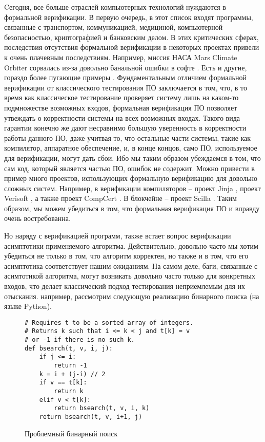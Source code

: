 Cегодня, все больше отраслей компьютерных технологий нуждаются в формальной верификации. В первую очередь, в этот список входят программы,
связанные с транспортом, коммуникацией, медициной, компьютерной безопасностью, криптографией и банковским делом.
В этих критических сферах,
последствия отсутствия формальной верификации в некоторых проектах привели к очень плачевным последствиям. Например, миссия НАСА Mars Climate Orbiter
сорвалась из-за довольно банальной ошибки в софте \cite{horror}. Есть и другие, гораздо более пугающие примеры \cite{horror}.
Фундаментальным отличием формальной верификации от классического тестирования ПО заключается в том, что, в то время как классическое
тестирование проверяет систему лишь на каком-то подмножестве возможных входов, формальная верификация ПО позволяет утвеждать о
корректности системы на всех возможных входах. Такого вида гарантии конечно же дают несравнимо большую уверенность в корректности
работы данного ПО, даже учитвая то, что остальные части системы, такие как компилятор, аппаратное обеспечение, и,
в конце концов, само ПО, используемое для верификации, могут дать сбои. Ибо мы таким образом убеждаемся в том, что сам код, который
является частью ПО, ошибок не содержит. Можно привести в пример много проектов, использующих формальную верификацию для довольно сложных
систем. Например, в верификации компиляторов -- проект Jinja \cite{KleinN-TCS,KleinN-ACM}, проект Verisoft
\cite{Strecker_compilerverification,Leinenbach}, а также проект CompCert \cite{Xavier,CompCert}.
В блокчейне -- проект Scilla \cite{sergey2018scilla}. Таким образом, мы можем убедиться в том, что формальная верификация ПО
и вправду очень востребованна.
\par
Но наряду с верификацией программ, также встает вопрос верификации асимптотики применяемого алгоритма. Действительно, довольно часто
мы хотим убедиться не только в том, что алгоритм корректен, но также и в том, что его асимптотика соответствует нашим ожиданиям.
На самом деле, баги, связанные с асимтотикой алгоритма, могут возникать довольно часто только для конкретных входов, что делает
классический подход тестирования неприемлемым для их отыскания. например, рассмотрим следующую реализацию бинарного поиска
(на языке Python).
\pagebreak
\begin{figure}[H]
    \caption{Проблемный бинарный поиск}
    \label{code:bsearch}
    \begin{verbatim}
# Requires t to be a sorted array of integers.
# Returns k such that i <= k < j and t[k] = v
# or -1 if there is no such k.
def bsearch(t, v, i, j):
    if j <= i:
        return -1
    k = i + (j-i) // 2
    if v == t[k]:
        return k
    elif v < t[k]:
        return bsearch(t, v, i, k)
    return bsearch(t, v, i+1, j)
\end{verbatim}
\end{figure}
